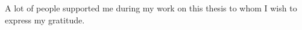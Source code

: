 \begin{center} 
    \huge {}
\end{center}


A lot of people supported me during my work on this thesis to whom I wish to express my gratitude.

